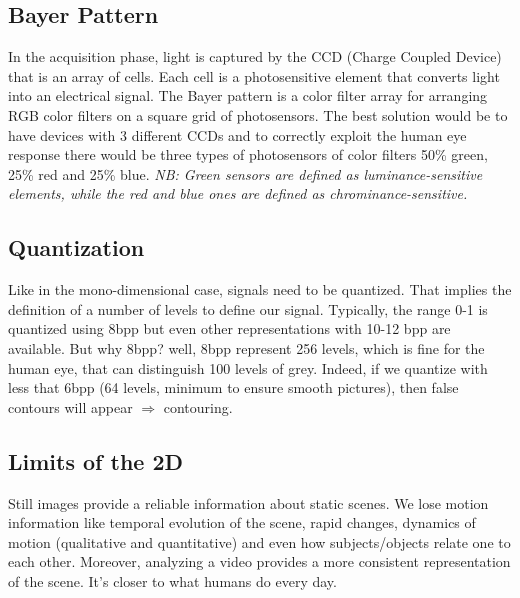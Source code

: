 \subsection{Bayer Pattern}
In the acquisition phase, light is captured by the CCD (Charge Coupled Device) that is an array of cells. Each cell is a photosensitive element that converts light into an electrical signal.
The Bayer pattern is a color filter array for arranging RGB color filters on a square grid of photosensors. The best solution would be to have devices with 3 different CCDs and to correctly exploit the human eye response there would be three types of photosensors of color filters 50\% green, 25\% red and 25\% blue.
\textit{NB: Green sensors are defined as luminance-sensitive elements, while the red and blue ones are defined as chrominance-sensitive.}
\subsection{Quantization}
Like in the mono-dimensional case, signals need to be quantized. That implies the definition of a number of levels to define our signal. Typically, the range 0-1 is quantized using 8bpp but even other representations with 10-12 bpp are available.
But why 8bpp? well, 8bpp represent 256 levels, which is fine for the human eye, that can distinguish 100 levels of grey. Indeed, if we quantize with less that 6bpp (64 levels, minimum to ensure smooth pictures), then false contours will appear $\Rightarrow$ contouring.
\\
\subsection{Limits of the 2D}
Still images provide a reliable information about static scenes.
We lose motion information like temporal evolution of the scene, rapid changes, dynamics of motion (qualitative and quantitative) and even how subjects/objects relate one to each other.
Moreover, analyzing a video provides a more consistent representation of the scene.
It’s closer to what humans do every day.

